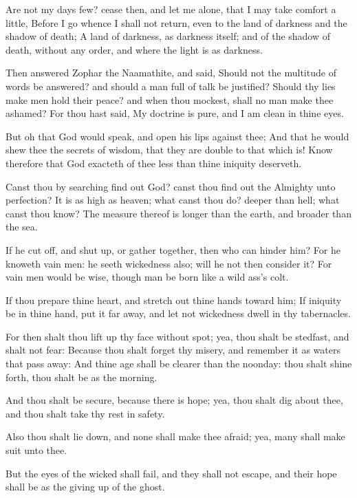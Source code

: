 \Verse Are not my days few? cease then, and let me alone, that I may take comfort a little, \Verse Before I go whence I shall not return, even to the land of darkness and the shadow of death; \Verse A land of darkness, as darkness itself; and of the shadow of death, without any order, and where the light is as darkness.


\Chapter
\Verse Then answered Zophar the Naamathite, and said, \Verse Should not the multitude of words be answered? and should a man full of talk be justified?  \Verse Should thy lies make men hold their peace? and when thou mockest, shall no man make thee ashamed?  \Verse For thou hast said, My doctrine is pure, and I am clean in thine eyes.

\Verse But oh that God would speak, and open his lips against thee; \Verse And that he would shew thee the secrets of wisdom, that they are double to that which is! Know therefore that God exacteth of thee less than thine iniquity deserveth.

\Verse Canst thou by searching find out God? canst thou find out the Almighty unto perfection?  \Verse It is as high as heaven; what canst thou do? deeper than hell; what canst thou know?  \Verse The measure thereof is longer than the earth, and broader than the sea.

\Verse If he cut off, and shut up, or gather together, then who can hinder him?  \Verse For he knoweth vain men: he seeth wickedness also; will he not then consider it?  \Verse For vain men would be wise, though man be born like a wild ass's colt.

\Verse If thou prepare thine heart, and stretch out thine hands toward him; \Verse If iniquity be in thine hand, put it far away, and let not wickedness dwell in thy tabernacles.

\Verse For then shalt thou lift up thy face without spot; yea, thou shalt be stedfast, and shalt not fear: \Verse Because thou shalt forget thy misery, and remember it as waters that pass away: \Verse And thine age shall be clearer than the noonday: thou shalt shine forth, thou shalt be as the morning.

\Verse And thou shalt be secure, because there is hope; yea, thou shalt dig about thee, and thou shalt take thy rest in safety.

\Verse Also thou shalt lie down, and none shall make thee afraid; yea, many shall make suit unto thee.

\Verse But the eyes of the wicked shall fail, and they shall not escape, and their hope shall be as the giving up of the ghost.


